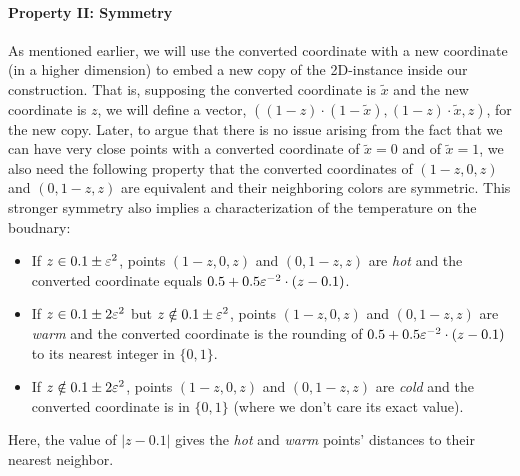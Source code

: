 \paragraph{Property II: Symmetry}
As mentioned earlier, we will use the converted coordinate with a new coordinate (in a higher dimension) to embed a new copy of the 2{\rm D}-\Sperner instance inside our construction.
That is, supposing the converted coordinate is $\tilde{x}$ and the new coordinate is $z$, we will define a vector, $((1-z)\cdot (1-\tilde{x}), (1-z)\cdot \tilde{x}, z)$, 
for the new copy. 
Later, to argue that there is no issue arising from the fact that we can have very close points with a converted coordinate of $\tilde{x}=0$ and of $\tilde{x}=1$, we also need the following property that the converted coordinates of $(1-z,0,z)$ and $(0,1-z,z)$ are equivalent and their neighboring colors are symmetric. 
This stronger symmetry also implies a characterization of the temperature on the boudnary:
\begin{itemize}[itemsep=0.2em,topsep=0.5em]
    \item If $z\in 0.1\pm \varepsilon^2$, points $(1-z,0,z)$ and $(0,1-z,z)$ are {\em hot} and the converted coordinate equals $0.5+0.5\varepsilon^{-2}\cdot(z-0.1)$.
    \item If $z\in 0.1\pm 2\varepsilon^2$ but $z\notin 0.1\pm \varepsilon^2$, points $(1-z,0,z)$ and $(0,1-z,z)$ are {\em warm} and the converted coordinate is the rounding of $0.5+0.5\varepsilon^{-2}\cdot(z-0.1)$ to its nearest integer in $\{0,1\}$.
    \item If $z\notin 0.1\pm 2\varepsilon^2$, points $(1-z,0,z)$ and $(0,1-z,z)$ are {\em cold} and the converted coordinate is in $\{0,1\}$ (where we don't care its exact value).
\end{itemize}
Here, the value of $|z-0.1|$ gives the {\em hot} and {\em warm} points' distances to their nearest neighbor. 

